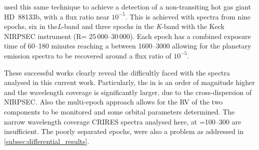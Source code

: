 \citep{piskorz_evidence_2016} used this same technique to achieve a detection of a non-transiting hot gas giant {HD~88133}b, with a flux ratio near \(10^{-5}\).
This is achieved with spectra from nine epochs, six in the\emph{L}-band and three epochs in the \emph{K}-band with the Keck {NIRPSEC} instrument (R= 25\,000--30\,000).
Each epoch has a combined exposure time of 60--180 minutes reaching a \snr{} between 1600--3000 allowing for the planetary emission spectra to be recovered around a flux ratio of \(10^{-5}\).

These successful works clearly reveal the difficultly faced with the spectra analysed in this current work.
Particularly, the \snr{} in \citep{piskorz_evidence_2016} is an order of magnitude higher and the wavelength coverage is significantly larger, due to the cross-dispersion of {NIRPSEC}.
Also the multi-epoch approach allows for the {RV} of the two components to be monitored and some orbital parameters determined.
The narrow wavelength coverage CRIRES spectra analysed here, at \snr{}=100--300 are insufficient.
The poorly separated epochs, were also a problem as addressed in \cref{subsec:differential_results}.


